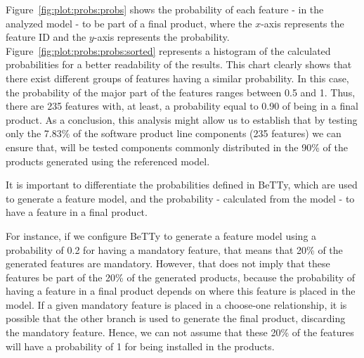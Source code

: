Figure~\ref{fig:plot:probs:probs} shows the probability of each feature - in the analyzed model - to
be part of a final product, where the $x$-axis
represents the feature ID and the $y$-axis represents the probability.
Figure~\ref{fig:plot:probs:probs:sorted} represents a histogram of the calculated probabilities for a better
readability of the results. This chart clearly shows that there exist
different groups of features having a similar probability.
In this case, the probability of the major part
of the features ranges between 0.5 and 1.
%
Thus, there are 235 features with, at least, a probability equal to 0.90 of being in a final product.
As a conclusion, this analysis might allow us to establish that by testing only
the 7.83\% of the software product line components (235 features) we can ensure that,
will be tested components commonly distributed in the 90\% of the products generated using the referenced model.

It is important to differentiate the probabilities defined in BeTTy, which are used to generate a
feature model, and the probability - calculated from the model - to have a feature in a final
product.

For instance, if we configure BeTTy to generate a feature model using a probability
of 0.2 for having a mandatory feature, that means that 20\% of the generated features are mandatory.
However, that does not imply that these features be part of the 20\% of the generated products, because
the probability of having a feature in a final product depends on where this feature is placed in the
model. If a given mandatory feature is placed in a choose-one relationship, it is possible that
the other branch is used to generate the final product, discarding the mandatory feature.
Hence, we can not assume that these 20\% of the features will have a probability of 1 for being
installed in the products.




